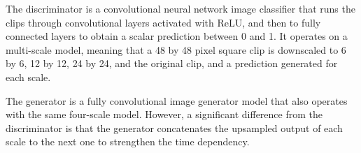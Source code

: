 \documentclass{article}
\begin{document}
The discriminator is a convolutional neural network image classifier that runs the clips through convolutional layers activated with ReLU, and then to fully connected layers to obtain a scalar prediction between 0 and 1. It operates on a multi-scale model, meaning that a 48 by 48 pixel square clip is downscaled to 6 by 6, 12 by 12, 24 by 24, and the original clip, and a prediction generated for each scale.

\begin{minipage}[t]{\linewidth}
    \centering
\end{minipage}

The generator is a fully convolutional image generator model that also operates with the same four-scale model. However, a significant difference from the discriminator is that the generator concatenates the upsampled output of each scale to the next one to strengthen the time dependency.

\begin{minipage}[t]{\linewidth}
    \centering
\end{minipage}
\end{document}
